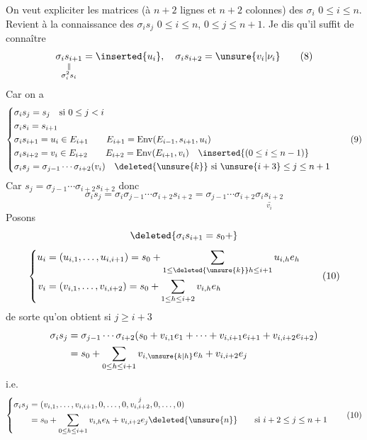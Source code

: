 On veut expliciter les matrices (à $n+2$ lignes et $n+2$ colonnes) des $\sigma_i$ $0\leq i\leq n$. Revient à la connaissance des $\sigma_is_j$ $0\leq i\leq n$, $0\leq j\leq n+1$. Je dis qu'il suffit de connaître
\[
\underset{\substack{\Vert\\\sigma_i^2s_i}}{\sigma_is_{i+1}}=\inserted{u_i},\quad\sigma_is_{i+2}=\unsure{v_i|\nu_i}\tag*{(8)}
\]
Car on a 
\[
\left\{\begin{aligned}
&\sigma_is_j=s_j\quad\text{si }0\leq j<i\\
&\sigma_is_i=s_{i+1}\\
&\sigma_is_{i+1}=u_i\in E_{i+1}\qquad E_{i+1}=\mathrm{Env}(E_{i-1},s_{i+1},u_i)\\
&\sigma_is_{i+2}=v_i\in E_{i+2}\qquad E_{i+2}=\mathrm{Env}(E_{i+1},v_i)\quad\inserted{(0\leq i\leq n-1)}\\
&\sigma_is_j=\sigma_{j-1}\cdots\sigma_{i+2}(v_i)\quad\deleted{\unsure{k}}\ \text{si }\unsure{i+3}\leq j\leq n+1
\end{aligned}\right.\tag*{(9)}
\]
Car $s_j=\sigma_{j-1}\cdots\sigma_{i+2}s_{i+2}$ donc
\[
\sigma_is_j=\sigma_i\sigma_{j-1}\cdots\sigma_{i+2}s_{i+2}=\sigma_{j-1}\cdots\sigma_{i+2}\underset{v_i}{\underline{\sigma_is_{i+2}}}
\]
Posons
\[
\deleted{\sigma_is_{i+1}=s_0+}
\]
\[
\left\{\begin{aligned}
u_i&=(u_{i,1},\ldots,u_{i,i+1})=s_0+\sum_{1\leq\deleted{\unsure{k}}h\leq i+1}u_{i,h}e_h\\
v_i&=(v_{i,1},\ldots,v_{i,i+2})=s_0+\sum_{1\leq h\leq i+2}v_{i,h}e_h
\end{aligned}\right.\tag*{(10)}
\]
de sorte qu'on obtient si $j\geq i+3$
\[
\begin{aligned}
\sigma_is_j&=\sigma_{j-1}\cdots\sigma_{i+2}(s_0+v_{i,1}e_1+\cdots+v_{i,i+1}e_{i+1}+v_{i,i+2}e_{i+2})\\
&=s_0+\sum_{0\leq h\leq i+1}v_{i,\unsure{k|h}}e_h+v_{i,i+2}e_j
\end{aligned}
\]
i.e.
\[
\left\{\begin{aligned}
\sigma_is_j&=(v_{i,1},\ldots,v_{i,i+1},0,\ldots,0,\overset{j}{v_{i,i+2}},0,\ldots,0)\\
&=s_0+\sum_{0\leq h\leq i+1}v_{i,h}e_h+v_{i,i+2}e_j\deleted{\unsure{n}}\qquad\text{si }i+2\leq j\leq n+1
\end{aligned}\right.\tag*{(10)}
\]

